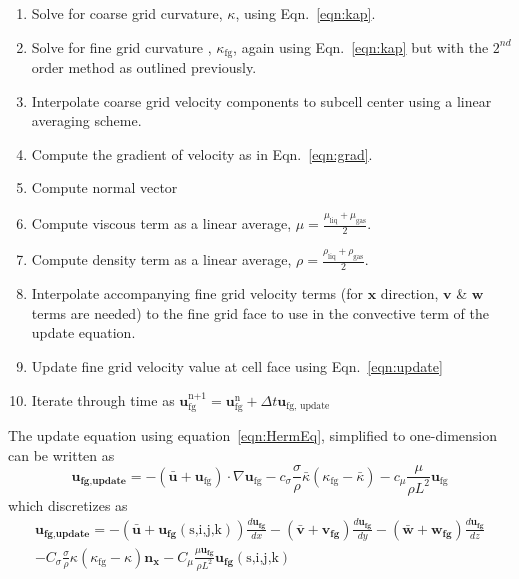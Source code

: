 \begin{enumerate}
	\item Solve for coarse grid curvature, $\kappa$, using Eqn.~\ref{eqn:kap}.
	\item Solve for fine grid curvature , $\kappa_{\text{fg}}$, again using Eqn.~\ref{eqn:kap} but with the $2^{nd}$ order method as outlined previously.
	\item Interpolate coarse grid velocity components to subcell center using a linear averaging scheme.
	\item Compute the gradient of velocity as in Eqn.~\ref{eqn:grad}.
	\item Compute normal vector 
	\item Compute viscous term as a linear average, $\mu =\frac{ \mu_{\text{liq}} + \mu_{\text{gas}}}{2}$.
	\item Compute density term as a linear average, $\rho =\frac{ \rho_{\text{liq}} + \rho_{\text{gas}}}{2}$.
	\item Interpolate accompanying fine grid velocity terms (for $\bm{x}$ direction, $\bm{v}$ \& $\bm{w}$ terms are needed) to the fine grid face to use in the convective term of the update equation.
	\item Update fine grid velocity value at cell face using Eqn.~\ref{eqn:update}
	\item Iterate through time as $\bm{u}_{\text{fg}}^{\text{n+1}}  = \bm{u}_{\text{fg}}^{\text{n}}+ \Delta t \bm{u}_{\text{fg, update}}$
\end{enumerate}
The update equation using equation~\ref{eqn:HermEq}, simplified to one-dimension can be written as 
\begin{equation}
\bm{u_{\text{fg,update}}}= 
-(\bar{\bm{u}}+\bm{u}_{\text{fg}}) \cdot \nabla \bm{u}_{\text{fg}} 
-c_{\sigma}\frac{\sigma}{\rho}\bar{\kappa}(\kappa_{\text{fg}}-\bar{\kappa})- 
c_{\mu}\frac{\mu}{\rho L^2}\bm{u}_{\text{fg}}
\label{eqn:update}
\end{equation}
which discretizes as 
\begin{multline}
\bm{u_{\text{fg,update}}}=
- ( \bar{\bm{u}} + \bm{u_{\text{fg}}}(\text{s,i,j,k}) ) \frac{d\bm{u_{\text{fg}}}   } { dx} 
- ( \bar{\bm{v}} + \bm{v_{\text{fg}}}     ) \frac{d\bm{u_{\text{fg}}}   } { dy}
- ( \bar{\bm{w}} + \bm{w_{\text{fg}}}    ) \frac{d\bm{u_{\text{fg}}}   } { dz}  \\
- C_{\sigma}\frac{\sigma}{\rho}\kappa(\kappa_{\text{fg}}-\kappa)\bm{n_{\text{x}}} 
- C_{\mu} \frac{\mu \bm{u_{\text{fg}}}}{\rho L^2}  \bm{u_{\text{fg}}}(\text{s,i,j,k})
\end{multline}
